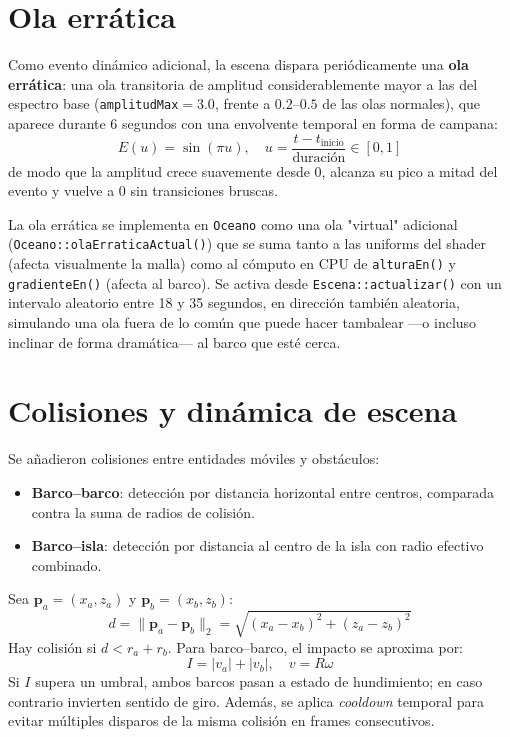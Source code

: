 \documentclass[11pt]{article}
\begin{document}
\section{Ola errática}\label{sec:erratica}
Como evento dinámico adicional, la escena dispara periódicamente una
\textbf{ola errática}: una ola transitoria de amplitud considerablemente
mayor a las del espectro base (\texttt{amplitudMax}$=3.0$, frente a
$0.2$--$0.5$ de las olas normales), que aparece durante 6 segundos con una
envolvente temporal en forma de campana:
\begin{equation}
    E(u) = \sin(\pi u), \quad u = \frac{t - t_{\text{inicio}}}{\text{duración}} \in [0,1]
\end{equation}
de modo que la amplitud crece suavemente desde 0, alcanza su pico a mitad
del evento y vuelve a 0 sin transiciones bruscas.

La ola errática se implementa en \texttt{Oceano} como una ola "virtual"
adicional (\texttt{Oceano::olaErraticaActual()}) que se suma tanto a las
uniforms del shader (afecta visualmente la malla) como al cómputo en CPU de
\texttt{alturaEn()} y \texttt{gradienteEn()} (afecta al barco). Se activa
desde \texttt{Escena::actualizar()} con un intervalo aleatorio entre 18 y 35
segundos, en dirección también aleatoria, simulando una ola fuera de lo
común que puede hacer tambalear —o incluso inclinar de forma dramática— al
barco que esté cerca.

\section{Colisiones y dinámica de escena}
Se añadieron colisiones entre entidades móviles y obstáculos:
\begin{itemize}
    \item \textbf{Barco--barco}: detección por distancia horizontal entre
    centros, comparada contra la suma de radios de colisión.
    \item \textbf{Barco--isla}: detección por distancia al centro de la isla
    con radio efectivo combinado.
\end{itemize}

Sea $\mathbf{p}_a=(x_a,z_a)$ y $\mathbf{p}_b=(x_b,z_b)$:
\begin{equation}
d=\|\mathbf{p}_a-\mathbf{p}_b\|_2=\sqrt{(x_a-x_b)^2+(z_a-z_b)^2}
\end{equation}
Hay colisión si $d<r_a+r_b$. Para barco--barco, el impacto se aproxima por:
\begin{equation}
I=|v_a|+|v_b|,\quad v=R\omega
\end{equation}
Si $I$ supera un umbral, ambos barcos pasan a estado de hundimiento; en caso
contrario invierten sentido de giro. Además, se aplica \emph{cooldown} temporal
para evitar múltiples disparos de la misma colisión en frames consecutivos.
\end{document}
